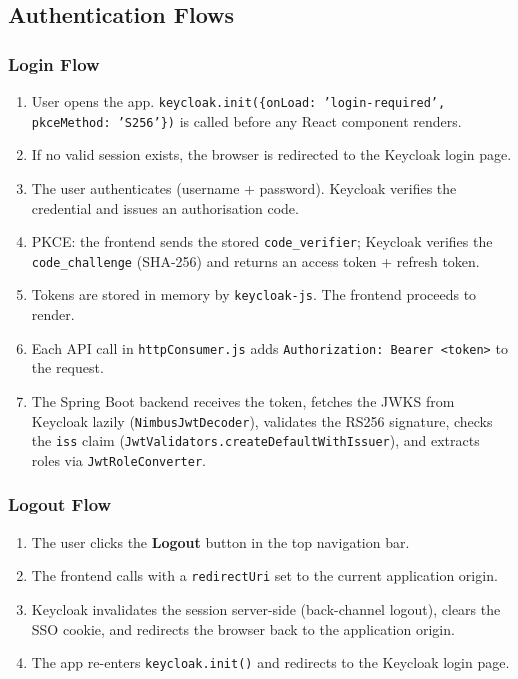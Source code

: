 \documentclass[12pt,a4paper]{report}
\begin{document}
\subsection{Authentication Flows}

\subsubsection{Login Flow}

\begin{enumerate}
  \item User opens the app. \texttt{keycloak.init(\{onLoad: 'login-required', pkceMethod: 'S256'\})} is
        called before any React component renders.
  \item If no valid session exists, the browser is redirected to the Keycloak login page.
  \item The user authenticates (username + password). Keycloak verifies the credential and
        issues an authorisation code.
  \item PKCE: the frontend sends the stored \texttt{code\_verifier}; Keycloak verifies the
        \texttt{code\_challenge} (SHA-256) and returns an access token + refresh token.
  \item Tokens are stored in memory by \texttt{keycloak-js}. The frontend proceeds to render.
  \item Each API call in \texttt{httpConsumer.js} adds \texttt{Authorization: Bearer <token>} to the request.
  \item The Spring Boot backend receives the token, fetches the JWKS from Keycloak lazily
        (\texttt{NimbusJwtDecoder}), validates the RS256 signature, checks the \texttt{iss} claim
        (\texttt{JwtValidators.createDefaultWithIssuer}), and extracts roles via \texttt{JwtRoleConverter}.
\end{enumerate}

\subsubsection{Logout Flow}

\begin{enumerate}
  \item The user clicks the \textbf{Logout} button in the top navigation bar.
  \item The frontend calls  with a \texttt{redirectUri} set to the current application origin.
  \item Keycloak invalidates the session server-side (back-channel logout), clears the SSO
        cookie, and redirects the browser back to the application origin.
  \item The app re-enters \texttt{keycloak.init()} and redirects to the Keycloak login page.
\end{enumerate}
\end{document}
